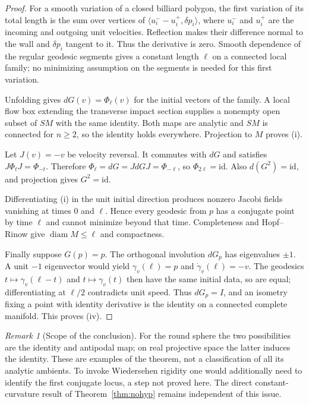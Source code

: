 \documentclass[11pt,a4paper]{article}
\theoremstyle{plain}
\theoremstyle{definition}
\theoremstyle{remark}
\newtheorem{remark}[theorem]{Remark}
\begin{document}
\begin{proof}
For a smooth variation of a closed billiard polygon, the first variation
of its total length is the sum over vertices of
$\langle u_i^- -u_i^+,\delta p_i\rangle$, where $u_i^-$ and $u_i^+$ are
the incoming and outgoing unit velocities. Reflection makes their difference
normal to the wall and $\delta p_i$ tangent to it. Thus the derivative is
zero. Smooth dependence of the regular geodesic segments gives a constant
length $\ell$ on a connected local family; no minimizing assumption on the
segments is needed for this first variation.

Unfolding gives $dG(v)=\Phi_\ell(v)$ for the initial vectors of the family.
A local flow box extending the transverse impact section supplies a nonempty
open subset of $SM$ with the same identity. Both maps are analytic and $SM$
is connected for $n\ge2$, so the identity holds everywhere. Projection to
$M$ proves (i).

Let $J(v)=-v$ be velocity reversal. It commutes with $dG$ and satisfies
$J\Phi_tJ=\Phi_{-t}$. Therefore
$\Phi_\ell=dG=JdGJ=\Phi_{-\ell}$, so $\Phi_{2\ell}=\mathrm{id}$.
Also $d(G^2)=\mathrm{id}$, and projection gives $G^2=\mathrm{id}$.

Differentiating (i) in the unit initial direction produces nonzero Jacobi
fields vanishing at times $0$ and $\ell$. Hence every geodesic from $p$
has a conjugate point by time $\ell$ and cannot minimize beyond that time.
Completeness and Hopf--Rinow give $\operatorname{diam}M\le\ell$ and compactness.

Finally suppose $G(p)=p$. The orthogonal involution $dG_p$ has eigenvalues
$\pm1$. A unit $-1$ eigenvector would yield
$\gamma_v(\ell)=p$ and $\dot\gamma_v(\ell)=-v$.
The geodesics $t\mapsto\gamma_v(\ell-t)$ and $t\mapsto\gamma_v(t)$ then
have the same initial data, so are equal; differentiating at $\ell/2$
contradicts unit speed. Thus $dG_p=I$, and an isometry fixing a point with
identity derivative is the identity on a connected complete manifold.
This proves (iv).
\end{proof}

\begin{remark}[Scope of the conclusion]
For the round sphere the two possibilities are the identity and antipodal
map; on real projective space the latter induces the identity. These are
examples of the theorem, not a classification of all its analytic ambients.
To invoke Wiedersehen rigidity one would additionally need to identify the
first conjugate locus, a step not proved here. The direct constant-curvature
result of Theorem~\ref{thm:nohyp} remains independent of this issue.
\end{remark}
\end{document}
